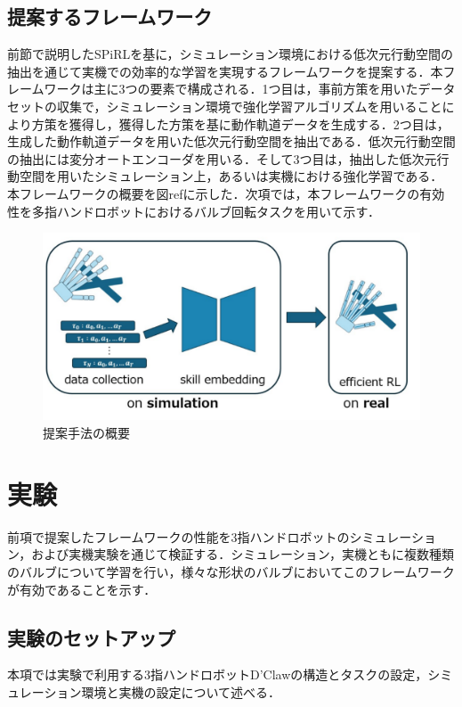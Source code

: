 \documentclass[dvipdfmx]{ampbt_nomag}
\begin{document}
\subsection{提案するフレームワーク}
前節で説明したSPiRLを基に，シミュレーション環境における低次元行動空間の抽出を通じて実機での効率的な学習を実現するフレームワークを提案する．本フレームワークは主に3つの要素で構成される．1つ目は，事前方策を用いたデータセットの収集で，シミュレーション環境で強化学習アルゴリズムを用いることにより方策を獲得し，獲得した方策を基に動作軌道データを生成する．2つ目は，生成した動作軌道データを用いた低次元行動空間を抽出である．低次元行動空間の抽出には変分オートエンコーダを用いる．そして3つ目は，抽出した低次元行動空間を用いたシミュレーション上，あるいは実機における強化学習である．\\
本フレームワークの概要を図ref{}に示した．次項では，本フレームワークの有効性を多指ハンドロボットにおけるバルブ回転タスクを用いて示す．

\begin{figure}[hbtp]
  \centering
  \includegraphics[width=17cm]
       {asset/img/schematic_figure.pdf}
  \caption{提案手法の概要}
  \label{dclaw_structure}
\end{figure}

\clearpage
\section{実験}\label{sec-experiment}
前項で提案したフレームワークの性能を3指ハンドロボットのシミュレーション，および実機実験を通じて検証する．シミュレーション，実機ともに複数種類のバルブについて学習を行い，様々な形状のバルブにおいてこのフレームワークが有効であることを示す．

\subsection{実験のセットアップ}
本項では実験で利用する3指ハンドロボットD'Clawの構造とタスクの設定，シミュレーション環境と実機の設定について述べる．
\end{document}
